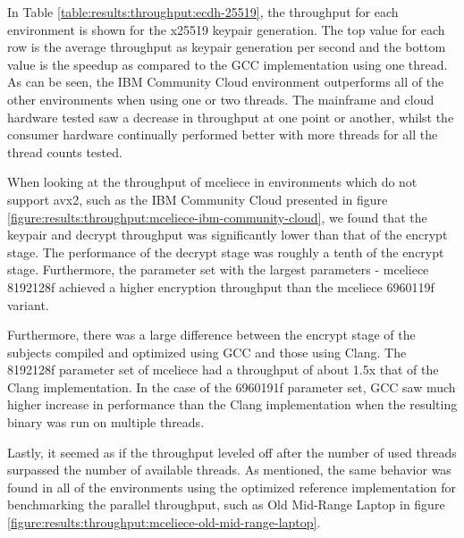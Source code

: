 In Table \ref{table:results:throughput:ecdh-25519}, the throughput for each environment is shown for the \gls{x25519} keypair generation. The top value for each row is the average throughput as keypair generation per second and the bottom value is the speedup as compared to the GCC implementation using one thread. As can be seen, the IBM Community Cloud environment outperforms all of the other environments when using one or two threads. The mainframe and cloud hardware tested saw a decrease in throughput at one point or another, whilst the consumer hardware continually performed better with more threads for all the thread counts tested.



When looking at the throughput of \gls{mceliece} in environments which do not support \gls{avx2}, such as the IBM Community Cloud presented in figure \ref{figure:results:throughput:mceliece-ibm-community-cloud}, we found that the keypair and decrypt throughput was significantly lower than that of the encrypt stage. The performance of the decrypt stage was roughly a tenth of the encrypt stage. Furthermore, the parameter set with the largest parameters - \gls{mceliece} 8192128f achieved a higher encryption throughput than the \gls{mceliece} 6960119f variant.

Furthermore, there was a large difference between the encrypt stage of the subjects compiled and optimized using GCC and those using Clang. The 8192128f parameter set of \gls{mceliece} had a throughput of about 1.5x that of the Clang implementation. In the case of the 6960191f parameter set, GCC saw much higher increase in performance than the Clang implementation when the resulting binary was run on multiple threads.

\noindent Lastly, it seemed as if the throughput leveled off after the number of used threads surpassed the number of available threads. As mentioned, the same behavior was found in all of the environments using the optimized reference implementation for benchmarking the parallel throughput, such as Old Mid-Range Laptop in figure \ref{figure:results:throughput:mceliece-old-mid-range-laptop}. 

